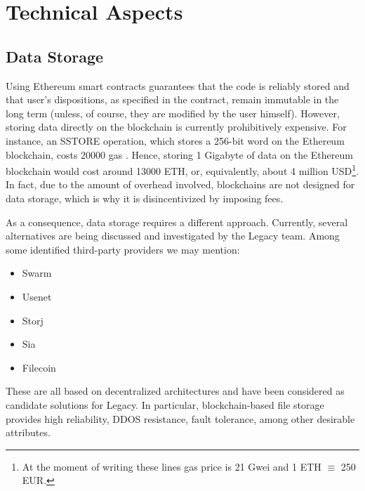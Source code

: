 
\section{Technical Aspects} %
\label{sec:technical_aspects}

\subsection{Data Storage} %
\label{sub:data_storage}
Using Ethereum smart contracts guarantees that the code is reliably stored and that user's dispositions, as specified in the contract, remain immutable in the long term (unless, of course, they are modified by the user himself). However, storing data directly on the blockchain is currently prohibitively expensive.
For instance, an SSTORE operation, which stores a 256-bit word on the Ethereum blockchain, costs 20000 gas \cite[Appendix G]{Wood}. Hence, storing 1 Gigabyte of data on the Ethereum blockchain would cost around 13000 ETH, or, equivalently, about 4 million USD\footnote{At the moment of writing these lines gas price is 21 Gwei and 1 ETH $\equiv$ 250 EUR.}.
In fact, due to the amount of overhead involved, blockchains are not designed for data storage, which is why it is disincentivized by imposing fees. 

As a consequence, data storage requires a different approach. Currently, several alternatives are being discussed and investigated by the Legacy team.
Among some identified third-party providers we may mention:

\begin{itemize}
	\item Swarm
	\item Usenet
	\item Storj
	\item Sia
	\item Filecoin
\end{itemize}

These are all based on decentralized architectures and have been considered as candidate solutions for Legacy.
In particular, blockchain-based file storage provides high reliability, DDOS resistance, fault tolerance, among other desirable attributes. 

